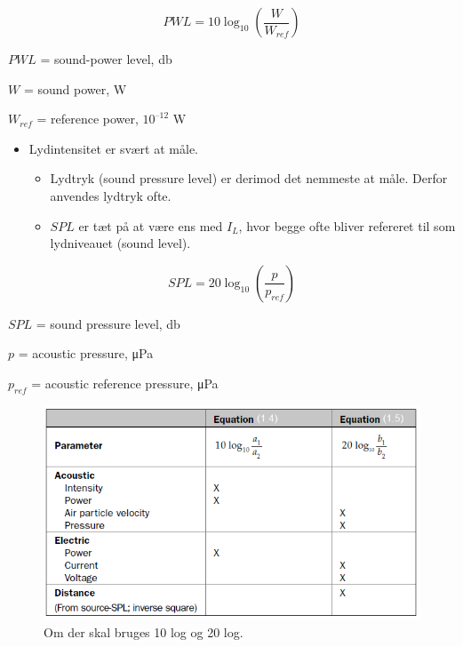 \begin{equation}\label{eq:decibel}
PWL = 10\log_{10}\left(\frac{W}{W_{ref}}\right)
\end{equation}
\newpage
\begin{description}
	\item $PWL$ = sound-power level, \si{\decibel}
	\item $W$ = sound power, \si{\watt}
	\item $W_{ref}$ = reference power, $10^{–12}$ \si{\watt}
\end{description}

\begin{itemize}
	\item Lydintensitet er svært at måle. 
	\begin{itemize}
		\item Lydtryk (sound pressure level) er derimod det nemmeste at måle. Derfor anvendes lydtryk ofte.
	\end{itemize}
	\begin{itemize}
		\item $SPL$ er tæt på at være ens med $I_L$, hvor begge ofte bliver refereret til som lydniveauet (sound level).
	\end{itemize}
\end{itemize}

\begin{equation}\label{eq:spl}
SPL = 20\log_{10}\left(\frac{p}{p_{ref}}\right)
\end{equation}

\begin{description}
	\item $SPL$ = sound pressure level, \si{\decibel}
	\item $p$ = acoustic pressure, \si{\micro\pascal}
	\item $p_{ref}$ = acoustic reference pressure, \si{\micro\pascal}
\end{description}

\begin{figure} [H]
	\centering
	\includegraphics[width=\linewidth]{graphics/6.png}
	\caption{Om der skal bruges 10 log og 20 log. }
	\label{fig:6}
\end{figure}

